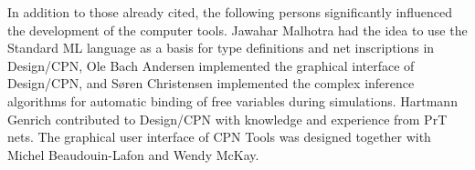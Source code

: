 In addition to those already cited, the following persons
significantly influenced the development of the computer
tools. Jawahar Malhotra had the idea to use the Standard ML language
as a basis for type definitions and net inscriptions in Design/CPN,
Ole Bach Andersen implemented the graphical interface of Design/CPN,
and S\o{}ren Christensen implemented the complex inference algorithms
for automatic binding of free variables during simulations. Hartmann
Genrich contributed to Design/CPN with knowledge and experience from
PrT nets. The graphical user interface of CPN Tools was designed
together with Michel Beaudouin-Lafon and Wendy McKay.





